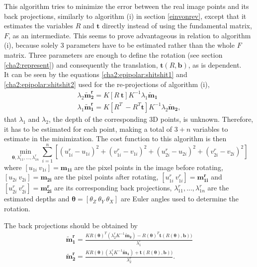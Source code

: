 This algorithm tries to minimize the error between the real image points and its back projections, similarly to algorithm (i) in section \ref{einvonrev}, except that it estimates the variables $R$ and $\mathbf{t}$ directly instead of using the fundamental matrix, $F$, as an intermediate. This seems to prove advantageous in relation to algorithm (i), because solely 3 parameters have to be estimated rather than the whole $F$ matrix. Three parameters are enough to define the rotation (see section \ref{cha2:represent}) and consequently the translation, $\mathbf{t}(R, \mathbf{b})$, as is dependent.\\
It can be seen by the equations \ref{cha2:epipolar:shitshit1} and \ref{cha2:epipolar:shitshit2} used for the re-projections of algorithm (i),
\begin{align}
	\lambda_2 \mathbf{\tilde{m}^r_2} = K [ R \ \mathbf{t} ] K^{-1} \lambda_1 \mathbf{\tilde{m}_1}\\
	\lambda_1 \mathbf{\tilde{m}^r_1} =  K [ R^{T} \ -R^{T}\mathbf{t} ]K^{-1} \lambda_2 \mathbf{\tilde{m}_2},
\end{align}
that $\lambda_1$ and $\lambda_2$, the depth of the corresponding 3D points, is unknown. Therefore, it has to be estimated for each point, making a total of $3+n$ variables to estimate in the minimization.
The cost function to this algorithm is then
\begin{equation}
\label{fiorenfe}
	\min_{\mathbf{\theta}, \lambda^r_{11}, ..., \lambda^r_{1n}} \sum^n_{i=1} [(u^r_{1i}-u_{1i})^2  + (v^r_{1i}-v_{1i})^2 + (u^r_{2i}-u_{2i})^2 + (v^r_{2i}-v_{2i})^2]
\end{equation}
where $[u_{1i} \ v_{1i}] = \mathbf{m_{1i}}$ are the pixel points in the image before rotating, $[u_{2i} \ v_{2i}] = \mathbf{m_{2i}}$ are the pixel points after rotating, $[u_{1i}^r \ v_{1i}^r] = \mathbf{m_{1i}^r}$ and $[u_{2i}^r \ v_{2i}^r] = \mathbf{m_{2i}^r}$ are its corresponding back projections, $\lambda^r_{11}, ..., \lambda^r_{1n}$ are the estimated depths and $\mathbf{\theta} = [\theta_Z \ \theta_Y \ \theta_X]$ are Euler angles used to determine the rotation.

The back projections should be obtained by
\begin{align*}
	\mathbf{\tilde{m}_{1}^r} = \frac{KR(\mathbf{ \theta})^T(\lambda_{2}^r K^{-1}\mathbf{\tilde{m}_2}) - R(\mathbf{ \theta})^T \mathbf{t}(R(\mathbf{ \theta}), \mathbf{b}))}{\lambda_{1}^r}\\
	\mathbf{\tilde{m}_{2}^r} = \frac{KR(\mathbf{ \theta})(\lambda_{1}^r K^{-1}\mathbf{\tilde{m}_1}) + \mathbf{t}(R(\mathbf{ \theta}), \mathbf{b}))}{\lambda_{2}^r}.
\end{align*} 

